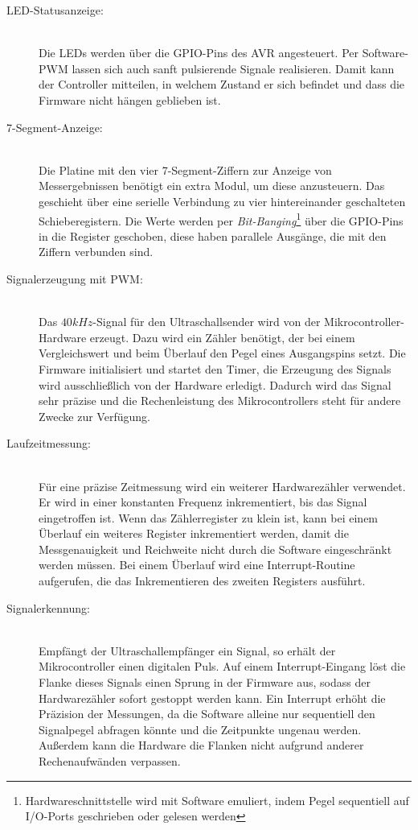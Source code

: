 \begin{description}
	\item[LED-Statusanzeige:] \hfill \\
		Die LEDs werden über die \ac{GPIO}-Pins des AVR angesteuert. Per Software-\ac{PWM} lassen sich auch sanft pulsierende Signale realisieren. Damit kann der Controller mitteilen, in welchem Zustand er sich befindet und dass die Firmware nicht hängen geblieben ist.
	\item[7-Segment-Anzeige:] \hfill \\
		Die Platine mit den vier 7-Segment-Ziffern zur Anzeige von Messergebnissen benötigt ein extra Modul, um diese anzusteuern. Das geschieht über eine serielle Verbindung zu vier hintereinander geschalteten Schieberegistern. Die Werte werden per \textit{Bit-Banging}\footnote{Hardwareschnittstelle wird mit Software emuliert, indem Pegel sequentiell auf I/O-Ports geschrieben oder gelesen werden} über die \ac{GPIO}-Pins in die Register geschoben, diese haben parallele Ausgänge, die mit den Ziffern verbunden sind.
	\item[Signalerzeugung mit \ac{PWM}:] \hfill \\
		Das $40kHz$-Signal für den Ultraschallsender wird von der Mikrocontroller-Hardware erzeugt. Dazu wird ein Zähler benötigt, der bei einem Vergleichswert und beim Überlauf den Pegel eines Ausgangspins setzt. Die Firmware initialisiert und startet den Timer, die Erzeugung des Signals wird ausschließlich von der Hardware erledigt. Dadurch wird das Signal sehr präzise und die Rechenleistung des Mikrocontrollers steht für andere Zwecke zur Verfügung.\newpage
	\item[Laufzeitmessung:] \hfill \\
		Für eine präzise Zeitmessung wird ein weiterer Hardwarezähler verwendet. Er wird in einer konstanten Frequenz inkrementiert, bis das Signal eingetroffen ist. Wenn das Zählerregister zu klein ist, kann bei einem Überlauf ein weiteres Register inkrementiert werden, damit die Messgenauigkeit und Reichweite nicht durch die Software eingeschränkt werden müssen. Bei einem Überlauf wird eine Interrupt-Routine aufgerufen, die das Inkrementieren des zweiten Registers ausführt.
	\item[Signalerkennung:] \hfill \\
		Empfängt der Ultraschallempfänger ein Signal, so erhält der Mikrocontroller einen digitalen Puls. Auf einem Interrupt-Eingang löst die Flanke dieses Signals einen Sprung in der Firmware aus, sodass der Hardwarezähler sofort gestoppt werden kann. Ein Interrupt erhöht die Präzision der Messungen, da die Software alleine nur sequentiell den Signalpegel abfragen könnte und die Zeitpunkte ungenau werden. Außerdem kann die Hardware die Flanken nicht aufgrund anderer Rechenaufwänden verpassen.

\end{description}
